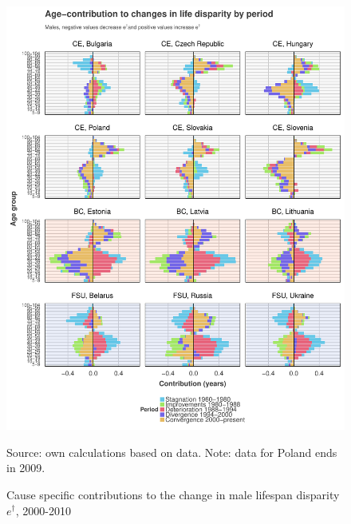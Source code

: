 \documentclass{article}
\begin{document}
\begin{figure}[h!]
\caption{Cause specific contributions to the change in  male lifespan disparity  $e^\dagger$, 2000-2010}
\label{Males_causes_2000}
\centering
\begin{center}
\includegraphics[scale=.70]{Figures/Figure_6.pdf}
\end{center}
Source: own calculations based on \citet{HcO} data. Note: data for Poland ends in 2009.
\end{figure}





%
\end{document}
